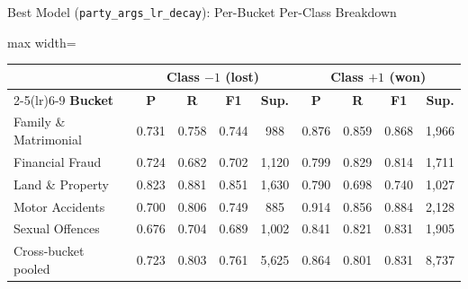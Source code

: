 \documentclass[aspectratio=169,11pt]{beamer}
\begin{document}
\begin{frame}{Best Model (\texttt{party\_args\_lr\_decay}): Per-Bucket Per-Class Breakdown}
  \scriptsize
  \centering
  \setlength{\tabcolsep}{5pt}
  \begin{adjustbox}{max width=\textwidth}
    \begin{tabular}{lcccccccc}
      \toprule
       & \multicolumn{4}{c}{\textbf{Class $-1$ (lost)}} & \multicolumn{4}{c}{\textbf{Class $+1$ (won)}} \\
      \cmidrule(lr){2-5}\cmidrule(lr){6-9}
      \textbf{Bucket} & \textbf{P} & \textbf{R} & \textbf{F1} & \textbf{Sup.} & \textbf{P} & \textbf{R} & \textbf{F1} & \textbf{Sup.} \\
      \midrule
      Family \& Matrimonial & 0.731 & 0.758 & 0.744 & 988    & 0.876 & 0.859 & 0.868 & 1{,}966 \\
      Financial Fraud       & 0.724 & 0.682 & 0.702 & 1{,}120 & 0.799 & 0.829 & 0.814 & 1{,}711 \\
      Land \& Property      & 0.823 & 0.881 & 0.851 & 1{,}630 & 0.790 & 0.698 & 0.740 & 1{,}027 \\
      Motor Accidents       & 0.700 & 0.806 & 0.749 & 885    & 0.914 & 0.856 & 0.884 & 2{,}128 \\
      Sexual Offences       & 0.676 & 0.704 & 0.689 & 1{,}002 & 0.841 & 0.821 & 0.831 & 1{,}905 \\
      \midrule
      Cross-bucket pooled   & 0.723 & 0.803 & 0.761 & 5{,}625 & 0.864 & 0.801 & 0.831 & 8{,}737 \\
      \bottomrule
    \end{tabular}
  \end{adjustbox}


\end{frame}
\end{document}
